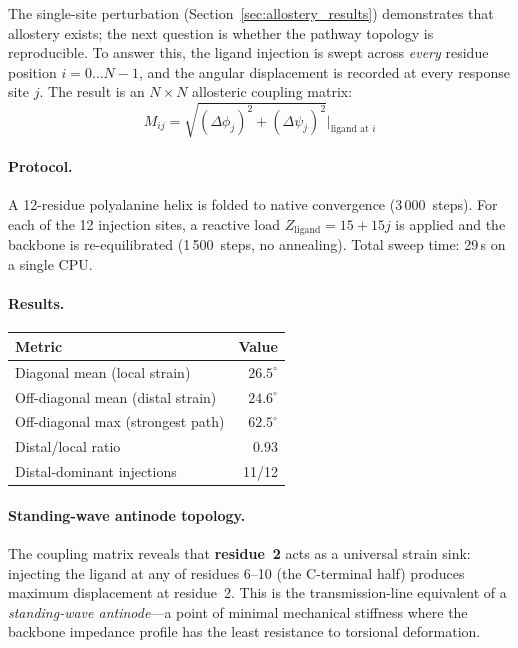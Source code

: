 The single-site perturbation (Section~\ref{sec:allostery_results})
demonstrates that allostery exists; the next question is whether the
pathway topology is reproducible.  To answer this, the ligand injection
is swept across \emph{every} residue position $i = 0 \ldots N{-}1$,
and the angular displacement is recorded at every response site $j$.
The result is an $N \times N$ allosteric coupling matrix:
\begin{equation}
    M_{ij} = \sqrt{(\Delta\phi_j)^2 + (\Delta\psi_j)^2}
    \Bigr|_{\text{ligand at } i}
    \label{eq:coupling_matrix}
\end{equation}

\paragraph{Protocol.}
A 12-residue polyalanine helix is folded to native convergence
(3\,000~steps).  For each of the 12 injection sites, a reactive load
$Z_\text{ligand} = 15 + 15j$ is applied and the backbone is
re-equilibrated (1\,500~steps, no annealing).  Total sweep time:
29\,s on a single CPU.

\paragraph{Results.}
\begin{center}
\small
\begin{tabular}{@{}l r@{}}
\toprule
\textbf{Metric} & \textbf{Value} \\
\midrule
Diagonal mean (local strain)        & $26.5^\circ$ \\
Off-diagonal mean (distal strain)   & $24.6^\circ$ \\
Off-diagonal max (strongest path)   & $62.5^\circ$ \\
Distal/local ratio                  & 0.93 \\
Distal-dominant injections          & 11/12 \\
\bottomrule
\end{tabular}
\end{center}

\paragraph{Standing-wave antinode topology.}
The coupling matrix reveals that \textbf{residue~2} acts as a
universal strain sink: injecting the ligand at any of residues
6--10 (the C-terminal half) produces maximum displacement at
residue~2.  This is the transmission-line equivalent of a
\emph{standing-wave antinode}---a point of minimal mechanical
stiffness where the backbone impedance profile has the least
resistance to torsional deformation.


